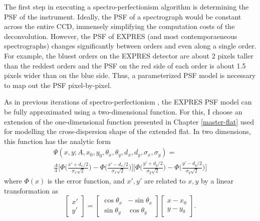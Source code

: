 The first step in executing a spectro-perfectionism algorithm is determining the PSF of the instrument. Ideally, the PSF of a spectrograph would be constant across the entire CCD, immensely simplifying the computation costs of the deconvolution. However, the PSF of EXPRES (and most contemporaeneous spectrographs) changes significantly between orders and even along a single order. For example, the bluest orders on the EXPRES detector are about 2 pixels taller than the reddest orders and the PSF on the red side of each order is about 1.5 pixels wider than on the blue side. Thus, a parameterized PSF model is necessary to map out the PSF pixel-by-pixel.

As in previous iterations of spectro-perfectionism \citep{bolton_spectro-perfectionism_2009, cornachione_full_2019}, the EXPRES PSF model can be fully approximated using a two-dimensional function. For this, I choose an extension of the one-dimensional function presented in Chapter \ref{master-flat} used for modelling the cross-dispersion shape of the extended flat. In two dimensions, this function has the analytic form
\begin{multline}
    \Psi(x, y; A, x_0, y_0, \theta_x, \theta_y, d_x, d_y, \sigma_x, \sigma_y) = \\
    \frac{A}{4} \Bigg[\Phi\bigg(\frac{x' + d_x/2}{\sigma_x \sqrt{2}}\bigg) - \Phi\bigg(\frac{x' - d_x/2}{\sigma_x \sqrt{2}}\bigg)\Bigg] \Bigg[\Phi\bigg(\frac{y' + d_y/2}{\sigma_y \sqrt{2}}\bigg) - \Phi\bigg(\frac{y' - d_y/2}{\sigma_y \sqrt{2}}\bigg)\Bigg]
    \label{eq:expres_psf}
\end{multline}
where $\Phi(x)$ is the error function, and $x',y'$ are related to $x,y$ by a linear transformation as
\begin{equation}
    \begin{bmatrix}x' \\ y' \end{bmatrix} = 
    \begin{bmatrix}\cos \theta_x & -\sin\theta_x \\ \sin \theta_y & \cos\theta_y\end{bmatrix}\begin{bmatrix}x-x_0 \\ y-y_0\end{bmatrix}.
    \label{eq:pix-transformation}
\end{equation}

